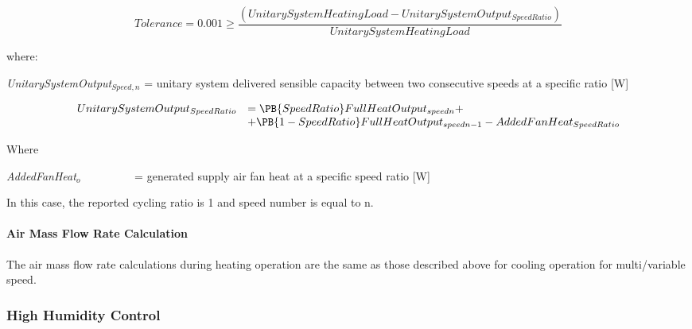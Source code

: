 \begin{equation}
Tolerance = 0.001 \ge \frac{{\left( {UnitarySystemHeatingLoad - UnitarySystemOutpu{t_{SpeedRatio}}} \right)}}{{UnitarySystemHeatingLoad}}
\end{equation}

where:

\emph{UnitarySystemOutput\(_{Speed,n}\)} = unitary system delivered sensible capacity between two consecutive speeds at a specific ratio {[}W{]}

\begin{equation}
  \begin{array}{rl}
    UnitarySystemOutput_{SpeedRatio} &= \PB{SpeedRatio} FullHeatOutput_{speedn} + \\
                                     &+ \PB{1 - SpeedRatio} FullHeatOutput_{speedn - 1} - AddedFanHeat_{SpeedRatio}
  \end{array}
\end{equation}

Where

\emph{AddedFanHeat\(_{o}\)}~~~~~~~~~ = generated supply air fan heat at a specific speed ratio {[}W{]}

In this case, the reported cycling ratio is 1 and speed number is equal to n.

\paragraph{Air Mass Flow Rate Calculation}\label{air-mass-flow-rate-calculation-1}

The air mass flow rate calculations during heating operation are the same as those described above for cooling operation for multi/variable speed.

\subsubsection{High Humidity Control}\label{high-humidity-control}

